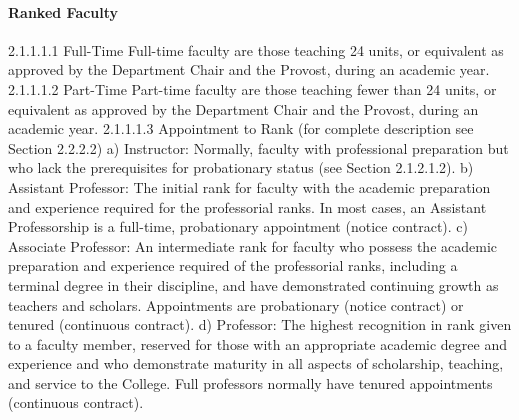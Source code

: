 \documentclass[letterpaper, 11pt]{article}
\begin{document}
			\paragraph{Ranked Faculty}
				2.1.1.1.1 Full-Time
				Full-time faculty are those teaching 24 units, or equivalent as approved by the Department Chair and the Provost, during an academic year.
				2.1.1.1.2 Part-Time
				Part-time faculty are those teaching fewer than 24 units, or equivalent as approved by the Department Chair and the Provost, during an academic year.
				2.1.1.1.3 Appointment to Rank
				(for complete description see Section 2.2.2.2)
				a) Instructor:  Normally, faculty with professional preparation but who lack the prerequisites for probationary status (see Section 2.1.2.1.2).
				b) Assistant Professor:  The initial rank for faculty with the academic preparation and experience required for the professorial ranks. In most cases, an Assistant Professorship is a full-time, probationary appointment (notice contract).
				c) Associate Professor:  An intermediate rank for faculty who possess the academic preparation and experience required of the professorial ranks, including a terminal degree in their discipline, and have demonstrated continuing growth as teachers and scholars. Appointments are probationary (notice contract) or tenured (continuous contract).
				d) Professor:  The highest recognition in rank given to a faculty member, reserved for those with an appropriate academic degree and experience and who demonstrate maturity in all aspects of scholarship, teaching, and service to the College. Full professors normally have tenured appointments (continuous contract).
\end{document}
